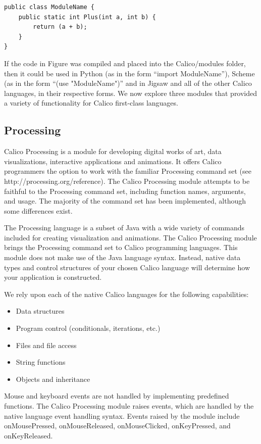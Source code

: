 \documentclass[preprint]{sigplanconf}
\begin{document}
\begin{verbatim}
public class ModuleName {
    public static int Plus(int a, int b) {
        return (a + b);
    }
}
\end{verbatim}

If the code in Figure was compiled and placed into the Calico/modules
folder, then it could be used in Python (as in the form ``import
ModuleName''), Scheme (as in the form ``(use "ModuleName")'' and in
Jigsaw and all of the other Calico languages, in their respective
forms. We now explore three modules that provided a variety of
functionality for Calico first-class languages.

\subsection{Processing}

Calico Processing is a module for developing digital works of art,
data visualizations, interactive applications and animations. It
offers Calico programmers the option to work with the familiar
Processing command set (see http://processing.org/reference). The
Calico Processing module attempts to be faithful to the Processing
command set, including function names, arguments, and usage. The
majority of the command set has been implemented, although some
differences exist.

The Processing language is a subset of Java with a wide variety of
commands included for creating visualization and animations. The
Calico Processing module brings the Processing command set to Calico
programming languages. This module does not make use of the Java
language syntax. Instead, native data types and control structures of
your chosen Calico language will determine how your application is
constructed.

We rely upon each of the native Calico languages for the following capabilities:

\begin{itemize}
\item Data structures
\item Program control (conditionals, iterations, etc.)
\item Files and file access
\item String functions
\item Objects and inheritance
\end{itemize}

Mouse and keyboard events are not handled by implementing predefined
functions. The Calico Processing module raises events, which are
handled by the native language event handling syntax. Events raised by
the module include onMousePressed, onMouseReleased, onMouseClicked,
onKeyPressed, and onKeyReleased.
\end{document}
